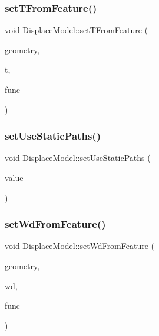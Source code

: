 \mbox{\label{class_displace_model_a5d1351b6d829f0fff88043a2a0aec912}} 
\subsubsection{\texorpdfstring{setTFromFeature()}{setTFromFeature()}}
{\footnotesize\ttfamily void Displace\+Model\+::set\+T\+From\+Feature (\begin{DoxyParamCaption}\item[{O\+G\+R\+Geometry $\ast$}]{geometry,  }\item[{double}]{t,  }\item[{std\+::function$<$ void(std\+::shared\+\_\+ptr$<$ \mbox{\hyperlink{class_node_data}{Node\+Data}} $>$, int)$>$}]{func }\end{DoxyParamCaption})\hspace{0.3cm}{\ttfamily [protected]}}

\mbox{\label{class_displace_model_a8c78f9404663cba939cfc05364791ea0}} 
\subsubsection{\texorpdfstring{setUseStaticPaths()}{setUseStaticPaths()}}
{\footnotesize\ttfamily void Displace\+Model\+::set\+Use\+Static\+Paths (\begin{DoxyParamCaption}\item[{int}]{value }\end{DoxyParamCaption})}

\mbox{\label{class_displace_model_a8d424f3fc69eff0d60f17df889602f9a}} 
\subsubsection{\texorpdfstring{setWdFromFeature()}{setWdFromFeature()}}
{\footnotesize\ttfamily void Displace\+Model\+::set\+Wd\+From\+Feature (\begin{DoxyParamCaption}\item[{O\+G\+R\+Geometry $\ast$}]{geometry,  }\item[{double}]{wd,  }\item[{std\+::function$<$ void(std\+::shared\+\_\+ptr$<$ \mbox{\hyperlink{class_node_data}{Node\+Data}} $>$, int)$>$}]{func }\end{DoxyParamCaption})\hspace{0.3cm}{\ttfamily [protected]}}

